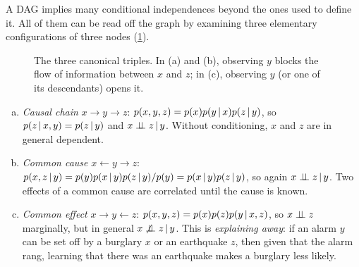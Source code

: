 A DAG implies many conditional independences beyond the ones used to define it. All of them can be read off the graph by examining three elementary configurations of three nodes (\cref{fig:triples}).

\begin{figure}[ht]
\centering
{}
\caption{The three canonical triples. In (a) and (b), observing $y$ blocks the flow of information between $x$ and $z$; in (c), observing $y$ (or one of its descendants) opens it.}
\label{fig:triples}
\end{figure}

\begin{enumerate}[(a)]
  \item \emph{Causal chain} $x\to y\to z$: $p(x,y,z)=p(x)p(y\,|\, x)p(z\,|\, y)$, so $p(z\,|\, x,y)=p(z\,|\, y)$ and $x\perp\!\!\!\perp z\,|\, y$. Without conditioning, $x$ and $z$ are in general dependent.
  \item \emph{Common cause} $x\leftarrow y\to z$: $p(x,z\,|\, y)=p(y)p(x\,|\, y)p(z\,|\, y)/p(y)=p(x\,|\, y)p(z\,|\, y)$, so again $x\perp\!\!\!\perp z\,|\, y$. Two effects of a common cause are correlated until the cause is known.
  \item \emph{Common effect} $x\to y\leftarrow z$: $p(x,y,z)=p(x)p(z)p(y\,|\, x,z)$, so $x\perp\!\!\!\perp z$ marginally, but in general $x\not\perp\!\!\!\perp z\,|\, y$. This is \emph{explaining away}: if an alarm $y$ can be set off by a burglary $x$ or an earthquake $z$, then given that the alarm rang, learning that there was an earthquake makes a burglary less likely.
\end{enumerate}

